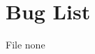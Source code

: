 \chapter{Bug List}
\hypertarget{bug}{}\label{bug}

\begin{DoxyRefList}
\item[File \doxylink{MyDLL_8h}{My\+DLL.h} ]\label{bug__bug000001}%
%
none 
\end{DoxyRefList}